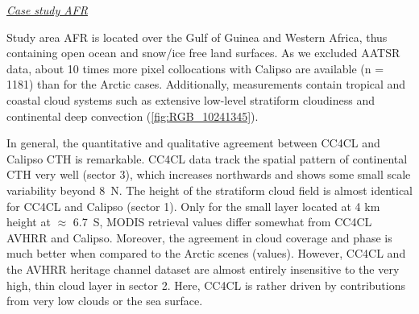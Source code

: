 


\vspace{5mm}\underline{\textit{Case study AFR}}\vspace{2mm}

Study area AFR is located over the Gulf of Guinea and Western Africa, thus containing open ocean and snow/ice free land surfaces. As we excluded AATSR data, about 10 times more pixel collocations with Calipso are available (n = 1181) than for the Arctic cases. Additionally, measurements contain tropical and coastal cloud systems such as extensive low-level stratiform cloudiness and continental deep convection (\cref{fig:RGB_10241345}).

In general, the quantitative and qualitative agreement between CC4CL and Calipso CTH is remarkable. CC4CL data track the spatial pattern of continental CTH very well (sector 3), which increases northwards and shows some small scale variability beyond 8\textdegree\ N. The height of the stratiform cloud field is almost identical for CC4CL and Calipso (sector 1). Only for the small layer located at 4 km height at $\approx$ 6.7\textdegree\ S, MODIS retrieval values differ somewhat from CC4CL AVHRR and Calipso.  Moreover, the agreement in cloud coverage and phase is much better when compared to the Arctic scenes (values). However, CC4CL and the AVHRR heritage channel dataset are almost entirely insensitive to the very high, thin cloud layer in sector 2. Here, CC4CL is rather driven by contributions from very low clouds or the sea surface. 

